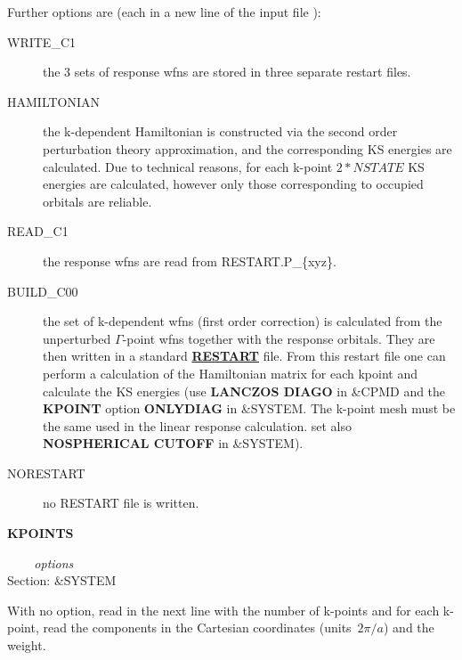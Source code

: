 \documentclass[twoside,10pt,titlepage,a4paper]{article}
\newcommand{\referto}[2]{\hyperlink{#1}{#2}}
\newcommand{\reflabel}[1]{\hypertarget{#1}}
\newcommand{\referto}[2]{\htmlref{#2}{#1}}
\newcommand{\reflabel}[1]{\label{#1}}
\newcommand{\keyword}[5]{%
\vspace{1.0cm}
\begin{minipage}{15cm}
\reflabel{#1}{\textbf{\large #1}}%
\index{#1}%
\ \textbf{#2}%
\ \textbf{#3}%
\ \textit{#4}%
     \hfill\\\smallskip
     {Section: #5}
     \hfill\\\smallskip\vskip 10pt
\end{minipage}
}%
\newcommand{\refkeyword}[1]{%
\referto{#1}{\textbf{#1}}%
\index{#1}%
}%
\newcommand{\desc}[1]{%
   \hspace*{\fill} \parbox{130mm}{\sloppy
                          {#1}%
                             }
     \hfill\\\smallskip
   }%
\newcommand{\desc}[1]{#1\vspace{1ex}}
\begin{document}
{    Further options are (each in a new line of the input file ):
    \begin{description}
    \item[WRITE\_C1]
     the 3 sets of response wfns are stored in three separate restart files.
    \item[HAMILTONIAN] the k-dependent Hamiltonian is constructed via
     the second order perturbation theory approximation, and the
    corresponding KS energies are calculated. Due to technical reasons, for
    each k-point $2*NSTATE$ KS energies are calculated, however only
    those corresponding to occupied orbitals are reliable.
    \item[READ\_C1] the response wfns are read from RESTART.P\_\{xyz\}.
    \item[BUILD\_C00] the set of k-dependent wfns (first order correction)
    is calculated from the
    unperturbed $\Gamma$-point wfns together with the
    response orbitals.
    They are then written in a standard \refkeyword{RESTART} file. 
    From this restart file one can perform a calculation of the 
    Hamiltonian matrix for each kpoint and calculate the KS energies 
    (use {\bf LANCZOS DIAGO} in \&CPMD and the {\bf KPOINT} option {\bf ONLYDIAG} in \&SYSTEM.
    The k-point mesh must be the same used in the linear response
     calculation. set also {\bf NOSPHERICAL CUTOFF} in \&SYSTEM).
    \item[NORESTART] no RESTART file is written.
    \end{description}
    }

\keyword{KPOINTS}{}{}{options}{\&SYSTEM}
  \desc{With no option, read in the next line with the number of k-points and for
    each k-point, read the components in the Cartesian coordinates
    (units~$2\pi/a$) and the weight.}
\end{document}

